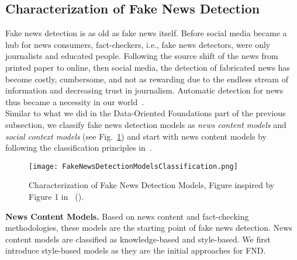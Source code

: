 \subsection{Characterization of Fake News Detection}
\label{subsec:FakeNewsDetection_Characterization}
Fake news detection is as old as fake news itself. Before social media became a hub for news consumers, fact-checkers, i.e., fake news detectors, were only journalists and educated people. Following the source shift of the news from printed paper to online, then social media, the detection of fabricated news has become costly, cumbersome, and not as rewarding due to the endless stream of information and decreasing trust in journalism. Automatic detection for news thus became a necessity in our world~\parencite{NewsInAnOnlineWorld_Chen}.\\
Similar to what we did in the Data-Oriented Foundations part of the previous subsection, we classify fake news detection models as \emph{news content models} and  \emph{social context models} (see Fig.~\ref{fig:FakeNewsDetectionModelsClassification}) and start with news content models by following the classification principles in~\parencite{FakeNewsDetectionOnSocialMediaADataMiningPerspective_Shu}.\\
\begin{figure}
    \centering
    \texttt{[image: FakeNewsDetectionModelsClassification.png]}
    \caption[Characterization of Fake News Detection Models]{Characterization of Fake News Detection Models, Figure inspired by Figure 1 in~\citeauthor{FakeNewsDetectionOnSocialMediaADataMiningPerspective_Shu} (\citeyear{FakeNewsDetectionOnSocialMediaADataMiningPerspective_Shu}).}
    \label{fig:FakeNewsDetectionModelsClassification}
\end{figure}
\textbf{News Content Models.} Based on news content and fact-checking methodologies, these models are the starting point of fake news detection. News content models are classified as knowledge-based and style-based. We first introduce style-based models as they are the initial approaches for FND.
